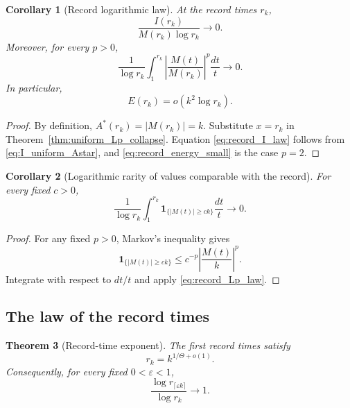 \documentclass[11pt]{amsart}
\numberwithin{equation}{section}
\theoremstyle{plain}
\newtheorem{theorem}{Theorem}[section]
\newtheorem{corollary}[theorem]{Corollary}
\theoremstyle{definition}
\theoremstyle{remark}
\begin{document}
\begin{corollary}[Record logarithmic law]
\label{cor:record_log_law}
At the record times \(r_k\),
\begin{equation}
\boxed{
\frac{I(r_k)}{M(r_k)\log r_k}\longrightarrow0.}
\label{eq:record_I_law}
\end{equation}
Moreover, for every \(p>0\),
\begin{equation}
\boxed{
\frac1{\log r_k}\int_1^{r_k}
\left|\frac{M(t)}{M(r_k)}\right|^p\frac{dt}{t}
\longrightarrow0.}
\label{eq:record_Lp_law}
\end{equation}
In particular,
\begin{equation}
\boxed{E(r_k)=o(k^2\log r_k).}
\label{eq:record_energy_small}
\end{equation}
\end{corollary}

\begin{proof}
By definition, \(A^*(r_k)=|M(r_k)|=k\).  Substitute \(x=r_k\) in
Theorem~\ref{thm:uniform_Lp_collapse}.  Equation
\eqref{eq:record_I_law} follows from \eqref{eq:I_uniform_Astar}, and
\eqref{eq:record_energy_small} is the case \(p=2\).
\end{proof}

\begin{corollary}[Logarithmic rarity of values comparable with the record]
\label{cor:record_occupancy}
For every fixed \(c>0\),
\begin{equation}
\boxed{
\frac1{\log r_k}
\int_1^{r_k}
\mathbf 1_{\{|M(t)|\ge ck\}}\frac{dt}{t}
\longrightarrow0.}
\label{eq:record_occupancy}
\end{equation}
\end{corollary}

\begin{proof}
For any fixed \(p>0\), Markov's inequality gives
\begin{equation}
\mathbf 1_{\{|M(t)|\ge ck\}}
\le c^{-p}\left|\frac{M(t)}{k}\right|^p.
\label{eq:occupancy_markov}
\end{equation}
Integrate with respect to \(dt/t\) and apply
\eqref{eq:record_Lp_law}.
\end{proof}

\subsection{The law of the record times}
\label{subsec:record_time_law}

\begin{theorem}[Record-time exponent]
\label{thm:record_time_exponent}
The first record times satisfy
\begin{equation}
\boxed{r_k=k^{1/\Theta+o(1)}.}
\label{eq:record_time_exponent}
\end{equation}
Consequently, for every fixed \(0<\varepsilon<1\),
\begin{equation}
\boxed{
\frac{\log r_{\lceil\varepsilon k\rceil}}
{\log r_k}\longrightarrow1.}
\label{eq:record_log_regular_variation}
\end{equation}
\end{theorem}
\end{document}
